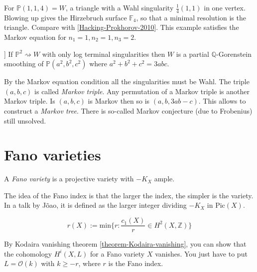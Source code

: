 \begin{example}
\label{example-Hirzebruch-surface}
For $\mathbb{P}(1,1,4)=W$, a triangle with a Wahl singularity
$\frac{1}{4}(1,1)$ in one vertex. Blowing up gives the Hirzebruch surface
$\mathbb{F}_4$, so that a minimal resolution is the triangle. Compare with
[\href{https://arxiv.org/pdf/2504.19929}{Hacking-Prokhorov-2010}]. This example
satisfies the Markov equation for $n_1=1,n_2=1,n_3=2$.
\end{example}

\begin{theorem}[[HP2010]]
\label{theorem-HP2010}
If $\mathbb{P}^2\rightsquigarrow W$ with only log terminal singularities then
$W$ is a partial $\mathbb{Q}$-Gorenstein smoothing of $\mathbb{P}(a^2,b^2,c^2)$
where $a^2+b^2+c^2=3abc$.
\end{theorem}
By the Markov equation condition all the singularities must be Wahl. The triple
$(a,b,c)$ is called {\it Markov triple}. Any permutation of a Markov triple is
another Markov triple. Is $(a,b,c)$ is Markov then so is $(a,b,3ab-c)$. This
allows to construct a {\it Markov tree}. There is so-called Markov conjecture
(due to Frobenius) still unsolved.

\section{Fano varieties}
\label{section-Fano-varieties}

\begin{definition}
\label{definition-Fano-variety}
A {\it Fano variety} is a projective variety with $-K_X$ ample.
\end{definition}

\noindent
The idea of the Fano index is that the
larger the index, the simpler is the variety.
In a talk by Jõao, it is defined as the larger integer
dividing $-K_X$ in $\text{Pic}(X)$.
\begin{definition}
\label{definition-Fano-index}
$$
r(X):=\text{min}\{r:\frac{c_1(X)}{r}\in H^{2}(X,\mathbb{Z})\}
$$
\end{definition}

\begin{exercise}
\label{exercise-Fano-vanishing-higher-cohomology}
By Kodaira vanishing theorem \ref{theorem-Kodaira-vanishing}, 
you can show that the cohomology $H^{i}(X,L)$ for
a Fano variety $X$ vanishes. You just have to put $L=\mathcal{O}(k)$ with $k\geq
-r$, where $r$ is the Fano index.
\end{exercise}

